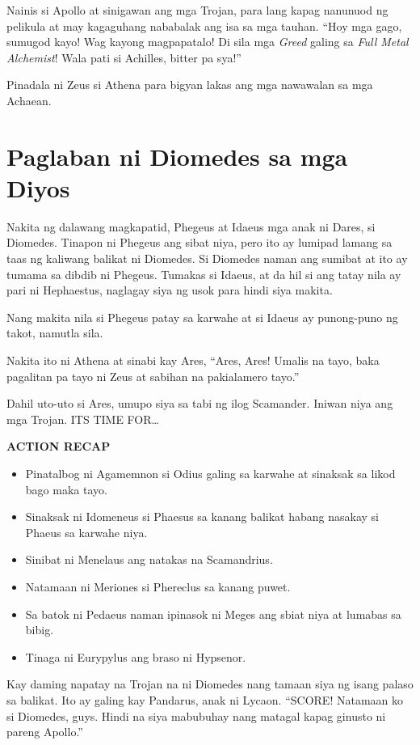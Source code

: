\documentclass[12pt,letterpaper]{report}
\newenvironment{recap}{\begin{samepage}\begin{center}{\large\textbf{ACTION RECAP}}\begin{itemize}}{\end{itemize}\end{center}\end{samepage}}
\begin{document}
Nainis si Apollo at sinigawan ang mga Trojan, para lang kapag nanunuod ng pelikula at may kagaguhang nababalak ang isa sa mga tauhan. ``Hoy mga gago, sumugod kayo! Wag kayong magpapatalo! Di sila mga \textit{Greed} galing sa \textit{Full Metal Alchemist}! Wala pati si Achilles, bitter pa sya!''

Pinadala ni Zeus si Athena para bigyan lakas ang mga nawawalan sa mga Achaean.

\pagebreak
\chapter{Paglaban ni Diomedes sa mga Diyos}

Nakita ng dalawang magkapatid, Phegeus at Idaeus mga anak ni Dares, si Diomedes. Tinapon ni Phegeus ang sibat niya, pero ito ay lumipad lamang sa taas ng kaliwang balikat ni Diomedes. Si Diomedes naman ang sumibat at ito ay tumama sa dibdib ni Phegeus. Tumakas si Idaeus, at da   hil si ang tatay nila ay pari ni Hephaestus, naglagay siya ng usok para hindi siya makita.

Nang makita nila si Phegeus patay sa karwahe at si Idaeus ay punong-puno ng takot, namutla sila.

Nakita ito ni Athena at sinabi kay Ares, ``Ares, Ares! Umalis na tayo, baka pagalitan pa tayo ni Zeus at sabihan na pakialamero tayo.''

Dahil uto-uto si Ares, umupo siya sa tabi ng ilog Scamander. Iniwan niya ang mga Trojan. ITS TIME FOR\dots

\begin{recap}
    \item Pinatalbog ni Agamemnon si Odius galing sa karwahe at sinaksak sa likod bago maka tayo.
    \item Sinaksak ni Idomeneus si Phaesus sa kanang balikat habang nasakay si Phaeus sa karwahe niya.
    \item Sinibat ni Menelaus ang natakas na Scamandrius.
    \item Natamaan ni Meriones si Phereclus sa kanang puwet.
    \item Sa batok ni Pedaeus naman ipinasok ni Meges ang sbiat niya at lumabas sa bibig.
    \item Tinaga ni Eurypylus ang braso ni Hypsenor.
\end{recap}

Kay daming napatay na Trojan na ni Diomedes nang tamaan siya ng isang palaso sa balikat. Ito ay galing kay Pandarus, anak ni Lycaon. ``SCORE! Natamaan ko si Diomedes, guys. Hindi na siya mabubuhay nang matagal kapag ginusto ni pareng Apollo.''
\end{document}
